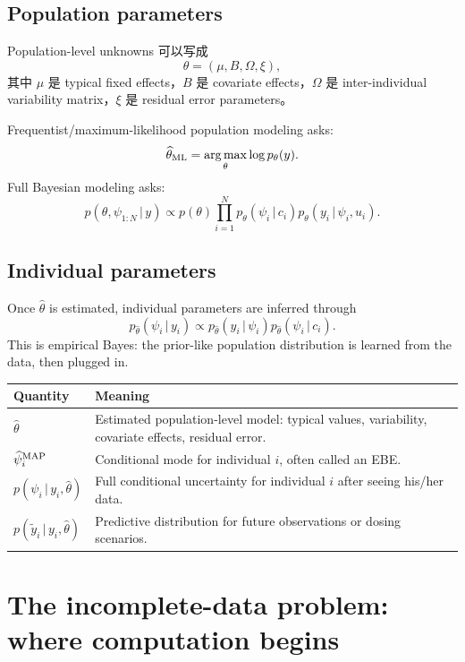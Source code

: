 \documentclass[a4paper]{article}
\DeclareMathOperator*{\argmax}{arg\,max}
\newcommand{\given}{\,|\,}
\begin{document}
\subsection{Population parameters}

Population-level unknowns 可以写成
\[
  \theta=(\mu,B,\Omega,\xi),
\]
其中 \(\mu\) 是 typical fixed effects，\(B\) 是 covariate effects，\(\Omega\) 是 inter-individual variability matrix，\(\xi\) 是 residual error parameters。

Frequentist/maximum-likelihood population modeling asks:
\[
  \widehat\theta_{\pklab{ML}}
  =
  \argmax_\theta \log p_\theta(y).
\]
Full Bayesian modeling asks:
\[
  p(\theta,\psi_{1:N}\given y)
  \propto
  p(\theta)
  \prod_{i=1}^N
  p_\theta(\psi_i\given c_i)
  p_\theta(y_i\given \psi_i,u_i).
\]

\subsection{Individual parameters}

Once \(\widehat\theta\) is estimated, individual parameters are inferred through
\[
  p_{\widehat\theta}(\psi_i\given y_i)
  \propto
  p_{\widehat\theta}(y_i\given \psi_i)
  p_{\widehat\theta}(\psi_i\given c_i).
\]
This is empirical Bayes: the prior-like population distribution is learned from the data, then plugged in.

\begin{center}
\begin{tabularx}{0.96\textwidth}{p{}X}
\toprule
Quantity & Meaning \\
\midrule
\(\widehat\theta\) & Estimated population-level model: typical values, variability, covariate effects, residual error. \\
\(\widehat\psi_i^{\mathrm{MAP}}\) & Conditional mode for individual \(i\), often called an EBE. \\
\(p(\psi_i\given y_i,\widehat\theta)\) & Full conditional uncertainty for individual \(i\) after seeing his/her data. \\
\(p(\tilde y_i\given y_i,\widehat\theta)\) & Predictive distribution for future observations or dosing scenarios. \\
\bottomrule
\end{tabularx}
\end{center}

\section{The incomplete-data problem: where computation begins}
\end{document}
